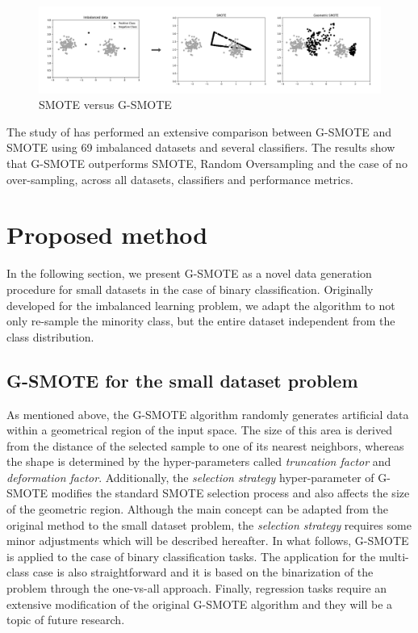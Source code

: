 \documentclass[parskip=full]{scrartcl}
\begin{document}
\begin{figure}[H]
	\centering
	\includegraphics[width=1\linewidth]{../analysis/smote_vs_gsmote}
	\caption{SMOTE versus G-SMOTE \cite{Douzas.2019}}
	\label{fig:smotevsgsmote}
\end{figure}

The study of \cite{Douzas.2019} has performed an extensive comparison between
G-SMOTE and SMOTE using 69 imbalanced datasets and several classifiers. The
results show that G-SMOTE outperforms SMOTE, Random Oversampling and the case of
no over-sampling, across all datasets, classifiers and performance metrics.

\section{Proposed method}

In the following section, we present G-SMOTE as a novel data generation
procedure for small datasets in the case of binary classification. Originally
developed for the imbalanced learning problem, we adapt the algorithm to not
only re-sample the minority class, but the entire dataset independent from the
class distribution. 

\subsection{G-SMOTE for the small dataset problem}

As mentioned above, the G-SMOTE algorithm randomly generates artificial data
within a geometrical region of the input space. The size of this area is derived
from the distance of the selected sample to one of its nearest neighbors,
whereas the shape is determined by the hyper-parameters called
\textit{truncation factor} and \textit{deformation factor}. Additionally, the
\textit{selection strategy} hyper-parameter  of G-SMOTE modifies the standard
SMOTE selection process and also affects the size of the geometric region.
Although the main concept can be adapted from the original method to the small
dataset problem, the \textit{selection strategy} requires some minor adjustments which
will be described hereafter. In what follows, G-SMOTE is applied to the case of
binary classification tasks. The application for the multi-class case is also
straightforward and it is based on the binarization of the problem through the
one-vs-all approach. Finally, regression tasks require an extensive modification
of the original G-SMOTE algorithm and they will be a topic of future research.
\end{document}
